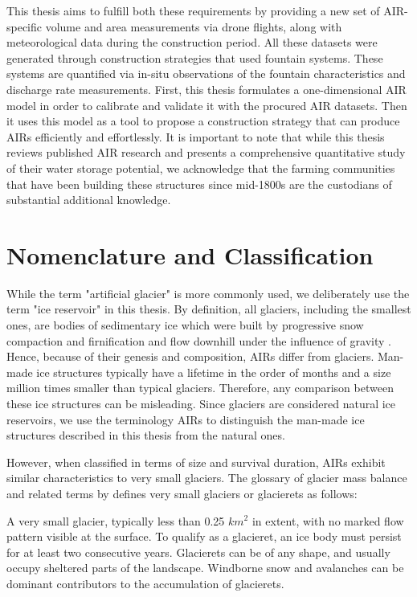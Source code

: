 This thesis aims to fulfill both these requirements by providing a new set of AIR-specific volume and area
measurements via drone flights, along with meteorological data during the construction period. All these
datasets were generated through construction strategies that used fountain systems. These systems are quantified via in-situ
observations of the fountain characteristics and discharge rate measurements. First, this thesis
formulates a one-dimensional AIR model in order to calibrate and validate it with the procured AIR datasets.
Then it uses this model as a tool to propose a construction strategy that can produce \ac{AIRs}
efficiently and effortlessly. It is important to note that while this thesis reviews published AIR research and
presents a comprehensive quantitative study of their water storage potential, we acknowledge that the farming
communities that have been building these structures since mid-1800s are the custodians of substantial additional knowledge.


\section{Nomenclature and Classification}

While the term "artificial glacier" is more commonly used, we deliberately use the term "ice reservoir" in this
thesis. By definition, all glaciers, including the smallest ones, are bodies of sedimentary ice which were built
by progressive snow compaction and firnification and flow downhill under the influence of gravity
\citep{benndouglasiGlaciersGlaciation2014}. Hence, because of their genesis and composition, \ac{AIRs} differ
from glaciers. Man-made ice structures typically have a lifetime in the order of months and a size million times
smaller than typical glaciers. Therefore, any comparison between these ice structures can be misleading. Since
glaciers are considered natural ice reservoirs, we use the terminology \ac{AIRs} to distinguish the man-made
ice structures described in this thesis from the natural ones. 

However, when classified in terms of size and survival duration, \ac{AIRs} exhibit similar characteristics to
very small glaciers. The glossary of glacier mass balance and related terms by
\citet{cogleyGlossaryGlacierMass2010} defines very small glaciers or glacierets as follows:

\begin{thesis_quotation}
  A very small glacier, typically less than 0.25 $km^2$ in extent, with no marked flow pattern
  visible at the surface. To qualify as a glacieret, an ice body must persist for at least two consecutive
  years. Glacierets can be of any shape, and usually occupy sheltered parts of the landscape. Windborne snow and
  avalanches can be dominant contributors to the accumulation of glacierets.
\end{thesis_quotation}


